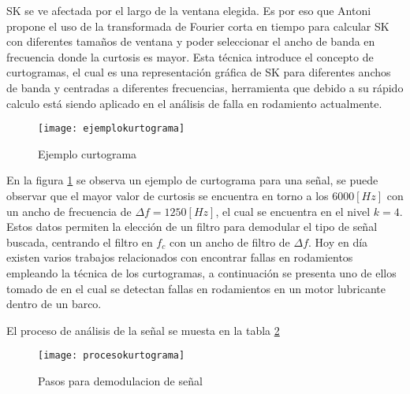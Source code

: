    			    SK se ve afectada por el largo de la ventana elegida. Es por eso que Antoni \cite{antoni2006spectral} propone el uso de la transformada de Fourier corta en tiempo para calcular SK con diferentes tamaños de ventana y poder seleccionar el ancho de banda en frecuencia donde la curtosis es mayor. Esta técnica introduce el concepto de curtogramas, el cual es una representación gráfica de SK para diferentes anchos de banda y centradas a diferentes frecuencias, herramienta que debido a su rápido calculo está siendo aplicado en el análisis de falla en rodamiento actualmente.
    			    \begin{figure}[H]
    			        \centering
    			        \texttt{[image: ejemplokurtograma]}
    			        \caption{Ejemplo curtograma}
    			        \label{fig:curtogramaejemplo}
    			    \end{figure}
    			En la figura \ref{fig:curtogramaejemplo} se observa un ejemplo de curtograma para una señal, se puede observar que el mayor valor de curtosis se encuentra en torno a los $6000[Hz]$ con un ancho de frecuencia de $\Delta f= 1250 [Hz] $, el cual se encuentra en el nivel $k=4$. Estos datos permiten la elección de un filtro para demodular el tipo de señal buscada, centrando el filtro en $f_c$ con un ancho de filtro de $\Delta f$.
    			Hoy en día existen varios trabajos relacionados con encontrar fallas en rodamientos empleando la técnica de los curtogramas, a continuación se presenta uno de ellos tomado de \cite{Konstantinos2016} en el cual se detectan fallas en rodamientos en un motor lubricante dentro de un barco.
    			
    			El proceso de análisis de la señal se muesta en la tabla \ref{fig:procesokurtograma}
    			\begin{figure}
    			    \centering
    			    \texttt{[image: procesokurtograma]}
    			    \caption{Pasos para demodulacion de señal}
    			    \label{fig:procesokurtograma}
    			\end{figure}
    			
